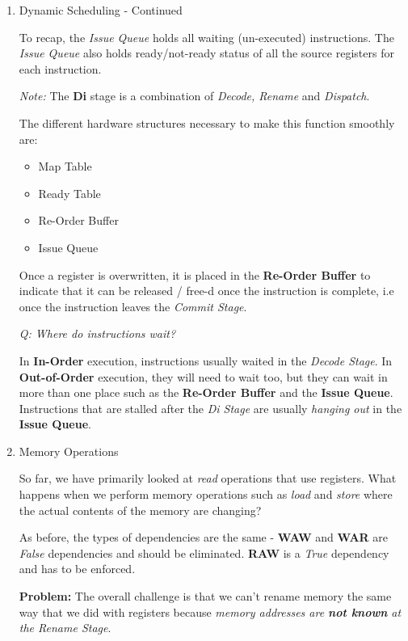 \documentclass[12pt]{article}
\newenvironment{QandA}{\begin{enumerate}[label=\bfseries\arabic*.]\bfseries}
                      {\end{enumerate}}
\newenvironment{answered}{\par\quad\normalfont}{}
\begin{document}
\begin{QandA}
\ 

\item Dynamic Scheduling - Continued
\begin{answered}
To recap, the \textit{Issue Queue} holds all waiting (un-executed) instructions. The \textit{Issue Queue} also holds ready/not-ready status of all the source registers for each instruction. 

\textit{Note:} The \textbf{Di} stage is a combination of \textit{Decode, Rename} and \textit{Dispatch}. 

The different hardware structures necessary to make this function smoothly are:
\begin{itemize}
    \item Map Table
    \item Ready Table
    \item Re-Order Buffer
    \item Issue Queue
\end{itemize}

Once a register is overwritten, it is placed in the \textbf{Re-Order Buffer} to indicate that it can be released / free-d once the instruction is complete, i.e once the instruction leaves the \textit{Commit Stage}. 

\textit{Q: Where do instructions wait?}

\quad In \textbf{In-Order} execution, instructions usually waited in the \textit{Decode Stage}. In \textbf{Out-of-Order} execution, they will need to wait too, but they can wait in more than one place such as the \textbf{Re-Order Buffer} and the \textbf{Issue Queue}. Instructions that are stalled after the \textit{Di Stage} are usually \textit{hanging out} in the \textbf{Issue Queue}.
\end{answered}

\newpage 

\item Memory Operations
\begin{answered}
So far, we have primarily looked at \textit{read} operations that use registers. What happens when we perform memory operations such as \textit{load} and \textit{store} where the actual contents of the memory are changing? 

As before, the types of dependencies are the same - \textbf{WAW} and \textbf{WAR} are \textit{False} dependencies and should be eliminated. \textbf{RAW} is a \textit{True} dependency and has to be enforced. 

\textbf{Problem:} The overall challenge is that we can't rename memory the same way that we did with registers because \textit{memory addresses are \textbf{not known} at the Rename Stage}. 
\end{answered}


\end{QandA}
\end{document}
